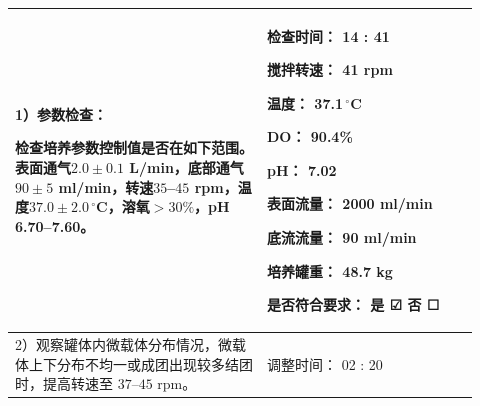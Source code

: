 \documentclass[UTF8,10pt,a4paper,fontset=fandol]{ctexart}
\newcommand{\fieldvalue}[1]{#1}
\newcommand{\handwritten}[1]{#1}
\newcommand{\checkboxfield}[1]{\ifstrequal{#1}{checked}{☑}{\ifstrequal{#1}{unclear}{?}{☐}}}
\begin{document}
\begin{tabular}{|p{0.50\linewidth}|p{0.42\linewidth}|}
\hline
\begin{minipage}[t]{\linewidth}
\vspace{2pt}
1）参数检查：

检查培养参数控制值是否在如下范围。表面通气$2.0\pm0.1$ L/min，底部通气$90\pm5$ ml/min，转速$35$--$45$ rpm，温度$37.0\pm2.0\,^\circ$C，溶氧$>30\%$，pH 6.70--7.60。
\vspace{4pt}
\end{minipage}
&
\begin{minipage}[t]{\linewidth}
\vspace{2pt}
检查时间：
\fieldvalue{\handwritten{14 : 41}}

搅拌转速：
\fieldvalue{\handwritten{41}} rpm

温度：
\fieldvalue{\handwritten{37.1}}$\,^\circ$C

DO：
\fieldvalue{\handwritten{90.4}}\%

pH：
\fieldvalue{\handwritten{7.02}}

表面流量：
\fieldvalue{\handwritten{2000}} ml/min

底流流量：
\fieldvalue{\handwritten{90}} ml/min

培养罐重：
\fieldvalue{\handwritten{48.7}} kg

是否符合要求：
是
\fieldvalue{\handwritten{\checkboxfield{checked}}}
\quad 否
\fieldvalue{\checkboxfield{unchecked}}
\vspace{2pt}
\end{minipage}
\\
\hline
\begin{minipage}[t]{\linewidth}
\vspace{2pt}
2）观察罐体内微载体分布情况，微载体上下分布不均一或成团出现较多结团时，提高转速至
$37$--$45$ rpm。
\vspace{4pt}
\end{minipage}
&
\begin{minipage}[t]{\linewidth}
\vspace{2pt}
调整时间：
\fieldvalue{\handwritten{02 : 20}}


\end{minipage}
\end{tabular}
\end{document}
